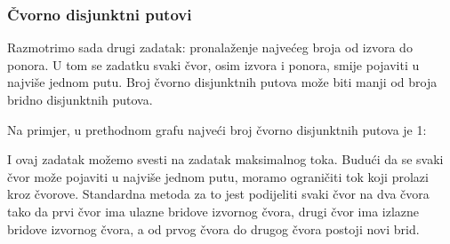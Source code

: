 \subsubsection{Čvorno disjunktni putovi}

Razmotrimo sada drugi zadatak:
pronalaženje najvećeg broja
 od izvora
do ponora.
U tom se zadatku svaki čvor,
osim izvora i ponora,
smije pojaviti u najviše jednom putu.
Broj čvorno disjunktnih putova
može biti manji od broja
bridno disjunktnih putova.

Na primjer, u prethodnom grafu
najveći broj čvorno disjunktnih putova je 1:

\begin{center}
\end{center}

I ovaj zadatak možemo svesti na zadatak maksimalnog toka.
Budući da se svaki čvor može pojaviti u najviše jednom putu,
moramo ograničiti tok koji prolazi kroz čvorove.
Standardna metoda za to jest podijeliti svaki čvor na
dva čvora tako da prvi čvor ima ulazne bridove
izvornog čvora, drugi čvor ima izlazne
bridove izvornog čvora, a
od prvog čvora do drugog čvora
postoji novi brid.

